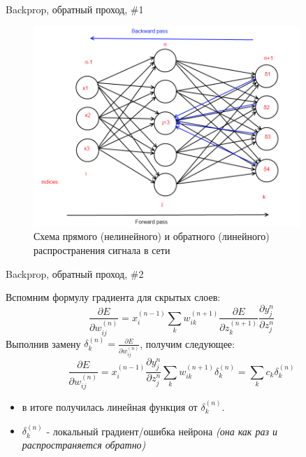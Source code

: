 \documentclass[10pt]{beamer}
\begin{document}
\begin{frame}{Backprop, обратный проход, \#1}

\begin{figure}[h!]
  \centering
  \includegraphics[width=0.9\textwidth]{images/f_b_pass.png}
  \caption{Схема прямого (нелинейного) и обратного (линейного) распространения сигнала в сети}
\end{figure}

\end{frame}


\begin{frame}{Backprop, обратный проход, \#2}

Вспомним формулу градиента для скрытых слоев:
\begin{equation*}
\dfrac{\partial E}{\partial w^{(n)}_{ij}} = x^{(n - 1)}_i \sum_k w^{(n + 1)}_{ik} \dfrac{\partial E}{\partial z^{(n + 1)}_k}  \dfrac{\partial y^{n}_{j}}{\partial z^{n}_{j}}
\end{equation*}
Выполнив замену $\delta_k^{(n)} = \frac{\partial E}{\partial w^{(n)}_{ij}}$, получим следующее:
\begin{equation*}
\dfrac{\partial E}{\partial w^{(n)}_{ij}} = x^{(n - 1)}_i \dfrac{\partial y^{n}_{j}}{\partial z^{n}_{j}} \sum_k w^{(n + 1)}_{ik} \delta_k^{(n)} = \sum_k c_k \delta_k^{(n)}
\end{equation*}
\begin{itemize}
	\item в итоге получилась линейная функция от $\delta_k^{(n)}$.
	\item $\delta_k^{(n)}$ - локальный градиент/ошибка нейрона \textit{(она как раз и распространяется обратно)}
\end{itemize}

\end{frame}
\end{document}
